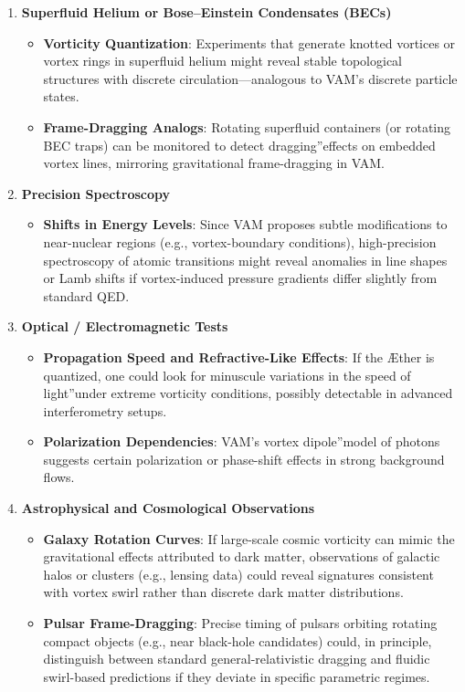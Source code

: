 \documentclass[a4paper,12pt]{article}
\begin{document}
\begin{enumerate}
    \item \textbf{Superfluid Helium or Bose–Einstein Condensates (BECs)}
    \begin{itemize}
        \item \textbf{Vorticity Quantization}: Experiments that generate knotted vortices or vortex rings in superfluid helium might reveal stable topological structures with discrete circulation—analogous to VAM's discrete particle states.
        \item \textbf{Frame-Dragging Analogs}: Rotating superfluid containers (or rotating BEC traps) can be monitored to detect \grqq dragging\textquotedblright effects on embedded vortex lines, mirroring gravitational frame-dragging in VAM.
    \end{itemize}

    \item \textbf{Precision Spectroscopy}
    \begin{itemize}
        \item \textbf{Shifts in Energy Levels}: Since VAM proposes subtle modifications to near-nuclear regions (e.g., vortex-boundary conditions), high-precision spectroscopy of atomic transitions might reveal anomalies in line shapes or Lamb shifts if vortex-induced pressure gradients differ slightly from standard QED.
    \end{itemize}

    \item \textbf{Optical / Electromagnetic Tests}
    \begin{itemize}
        \item \textbf{Propagation Speed and Refractive-Like Effects}: If the Æther is quantized, one could look for minuscule variations in the \grqq speed of light\textquotedblright under extreme vorticity conditions, possibly detectable in advanced interferometry setups.
        \item \textbf{Polarization Dependencies}: VAM's vortex \grqq dipole\textquotedblright model of photons suggests certain polarization or phase-shift effects in strong background flows.
    \end{itemize}

    \item \textbf{Astrophysical and Cosmological Observations}
    \begin{itemize}
        \item \textbf{Galaxy Rotation Curves}: If large-scale cosmic vorticity can mimic the gravitational effects attributed to dark matter, observations of galactic halos or clusters (e.g., lensing data) could reveal signatures consistent with vortex swirl rather than discrete dark matter distributions.
        \item \textbf{Pulsar Frame-Dragging}: Precise timing of pulsars orbiting rotating compact objects (e.g., near black-hole candidates) could, in principle, distinguish between standard general-relativistic dragging and fluidic swirl-based predictions if they deviate in specific parametric regimes.
    \end{itemize}
\end{enumerate}
\end{document}
